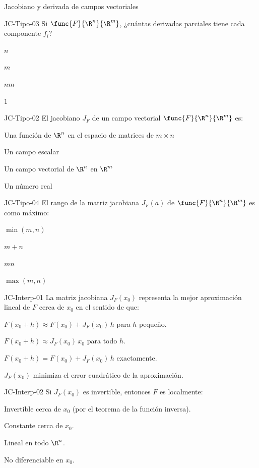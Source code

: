 \documentclass[a4,11pt]{aleph-notas}
\begin{document}
\begin{quiz}{Jacobiano y derivada de campos vectoriales}
\begin{multi}[]%
    {JC-Tipo-03}
    Si $\func{F}{\R^n}{\R^m}$, ¿cuántas derivadas parciales tiene cada componente $f_i$?
    \item* $n$
    \item $m$
    \item $nm$
    \item $1$
\end{multi}

\begin{multi}[]%
    {JC-Tipo-02}
    El jacobiano $J_F$ de un campo vectorial $\func{F}{\R^n}{\R^m}$ es:
    \item* Una función de $\R^n$ en el espacio de matrices de $m\times n$
    \item Un campo escalar
    \item Un campo vectorial de $\R^n$ en $\R^m$
    \item Un número real
\end{multi}

\begin{multi}[]%
    {JC-Tipo-04}
    El rango de la matriz jacobiana $J_F({a})$ de $\func{F}{\R^n}{\R^m}$ es como máximo:
    \item* $\min(m,n)$
    \item $m+n$
    \item $mn$
    \item $\max(m,n)$
\end{multi}

\begin{multi}[]%
    {JC-Interp-01}
    La matriz jacobiana $J_F({x}_0)$ representa la mejor aproximación lineal de $F$ cerca de ${x}_0$ en el sentido de que:
    \item* $F({x}_0 + {h}) \approx F({x}_0) + J_F({x}_0)\,{h}$ para ${h}$ pequeño.
    \item $F({x}_0 + {h}) \approx J_F({x}_0)\,{x}_0$ para todo ${h}$.
    \item $F({x}_0 + {h}) = F({x}_0) + J_F({x}_0)\,{h}$ exactamente.
    \item $J_F({x}_0)$ minimiza el error cuadrático de la aproximación.
\end{multi}

\begin{multi}[]%
    {JC-Interp-02}
    Si $J_F({x}_0)$ es invertible, entonces $F$ es localmente:
    \item* Invertible cerca de ${x}_0$ (por el teorema de la función inversa).
    \item Constante cerca de ${x}_0$.
    \item Lineal en todo $\R^n$.
    \item No diferenciable en ${x}_0$.
\end{multi}


\end{quiz}
\end{document}
